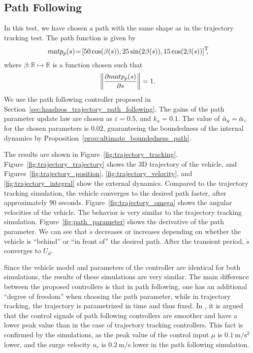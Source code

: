 \subsection{Path Following}


In this test, we have chosen a path with the same shape as in the trajectory tracking test.
The path function is given by
\begin{equation}
    mat{p}_p(s) \!=\! \inlinevector{50\cos\!\left(\beta(s)\right)\!, 25\sin\!\left(2\beta(s)\right)\!, 15\cos\!\left(2\beta(s)\right)}\!\!\!,
\end{equation}
where $\beta: \mathbb{R} \mapsto \mathbb{R}$ is a function chosen such that
\begin{equation}
    \left\|\frac{\partial mat{p}_p(s)}{\partial s}\right\| = 1.
\end{equation}
We use the path following controller proposed in Section~\ref{sec:handpos_trajectory_path_following}.
The gains of the path parameter update law are chosen as $\varepsilon = 0.5$, and $k_{\sigma} = 0.1$.
The value of $\Bar{\alpha}_y = \Bar{\alpha}_z$ for the chosen parameters is $0.02$, guaranteeing the boundedness of the internal dynamics by Proposition~\ref{prop:ultimate_boundedness_path}.

The results are shown in Figure~\ref{fig:trajectory_tracking}.
Figure~\ref{fig:trajectory_trajectory} shows the 3D trajectory of the vehicle, and Figures~\ref{fig:trajectory_position}, \ref{fig:trajectory_velocity}, and \ref{fig:trajectory_integral} show the external dynamics.
Compared to the trajectory tracking simulation, the vehicle converges to the desired path faster, after approximately $90$ seconds.
Figure~\ref{fig:trajectory_omega} shows the angular velocities of the vehicle.
The behavior is very similar to the trajectory tracking simulation.
Figure~\ref{fig:path_parameter} shows the derivative of the path parameter.
We can see that $\dot{s}$ decreases or increases depending on whether the vehicle is ``behind'' or ``in front of'' the desired path.
After the transient period, $\dot{s}$ converges to $U_d$.

Since the vehicle model and parameters of the controller are identical for both simulations, the results of these simulations are very similar.
The main difference between the proposed controllers is that in path following, one has an additional ``degree of freedom'' when choosing the path parameter, while in trajectory tracking, the trajectory is parametrized in time and thus fixed.
In \cite{aguiar_trajectory_tracking_2007}, it is argued that the control signals of path following controllers are smoother and have a lower peak value than in the case of trajectory tracking controllers.
This fact is confirmed by the simulations, as the peak value of the control input $\mu$ is $\SI{0.1}{\meter\per\second\squared}$ lower, and the surge velocity $u_r$ is $\SI{0.2}{\meter\per\second}$ lower in the path following simulation.

